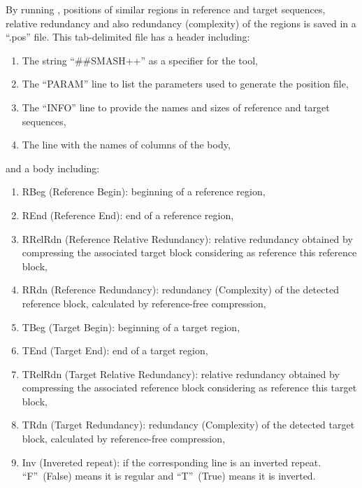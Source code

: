 \documentclass[a4paper,9pt]{extarticle}
\begin{document}

By running \smashpp, positions of similar regions in reference and target sequences, relative redundancy and also redundancy (complexity) of the regions is saved in a ``.pos'' file. This tab-delimited file has a header including:
\begin{enumerate}
  \item The string ``\#\#SMASH++'' as a specifier for the \smashpp tool,
  \item The ``PARAM'' line to list the parameters used to generate the position file,
  \item The ``INFO'' line to provide the names and sizes of reference and target sequences,
  \item The line with the names of columns of the body,
\end{enumerate}
and a body including:
\begin{enumerate}
  \item RBeg (Reference Begin): beginning of a reference region,
  \item REnd (Reference End): end of a reference region,
  \item RRelRdn (Reference Relative Redundancy): relative redundancy obtained by compressing the associated target block considering as reference this reference block,
  \item RRdn (Reference Redundancy): redundancy (Complexity) of the detected reference block, calculated by reference-free compression,
  \item TBeg (Target Begin): beginning of a target region,
  \item TEnd (Target End): end of a target region,
  \item TRelRdn (Target Relative Redundancy): relative redundancy obtained by compressing the associated reference block considering as reference this target block,
  \item TRdn (Target Redundancy): redundancy (Complexity) of the detected target block, calculated by reference-free compression,
  \item Inv (Invereted repeat): if the corresponding line is an inverted repeat. ``F''~(False) means it is regular and ``T''~(True) means it is inverted.
\end{enumerate}
\end{document}
